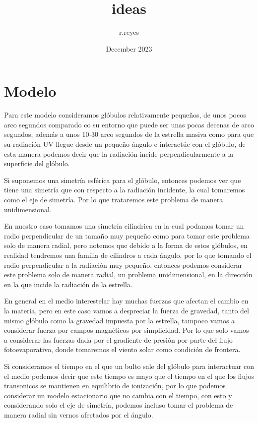 \documentclass{article}
\title{ideas}
\author{r.reyes }
\date{December 2023}
\begin{document}
\maketitle

\section{Modelo}

Para este modelo consideramos glóbulos relativamente pequeños, de unos pocos arco segundos comparado co su entorno que puede ser unas pocas decenas de arco segundos, además a unos 10-30 arco segundos de la estrella masiva como para que su radiación UV llegue desde un pequeño ángulo e interactúe con el glóbulo, de esta manera podemos decir que la radiación incide perpendicularmente a la superficie del glóbulo.

Si suponemos una simetría esférica para el glóbulo, entonces podemos ver que tiene una simetría que con respecto a la radiación incidente, la cual tomaremos como el eje de simetría.  Por lo que trataremos este problema de manera unidimensional. 

En nuestro caso tomamos una simetría cilíndrica en la cual podamos tomar un radio perpendicular de un tamaño muy pequeño como para tomar este problema solo de manera radial, pero notemos que debido a la forma de estos glóbulos, en realidad tendremos una familia de cilindros a cada ángulo, por lo que tomando el radio perpendicular a la radiación muy pequeño, entonces podemos considerar este problema solo de manera radial, un problema unidimensional, en la dirección en la que incide la radiación de la estrella.

En general en el medio interestelar hay muchas fuerzas que afectan el cambio en la materia, pero en este caso vamos a despreciar la fuerza de gravedad, tanto del mismo glóbulo como la gravedad impuesta por la estrella, tampoco vamos a considerar fuerza por campos magnéticos por simplicidad. Por lo que solo vamos a considerar las fuerzas dada por el gradiente de presión por parte del flujo fotoevaporativo, donde tomaremos el viento solar como condición de frontera.

Si consideramos el tiempo en el que un bulto sale del glóbulo para interactuar con el medio podemos decir que este tiempo es mayo que el tiempo en el que los flujos transonicos se mantienen en equilibrio de ionización, por lo que podemos considerar un modelo estacionario que no cambia con el tiempo, con esto y considerando solo el eje de simetría, podemos incluso tomar el problema de manera radial sin vernos afectados por el ángulo.
\end{document}
